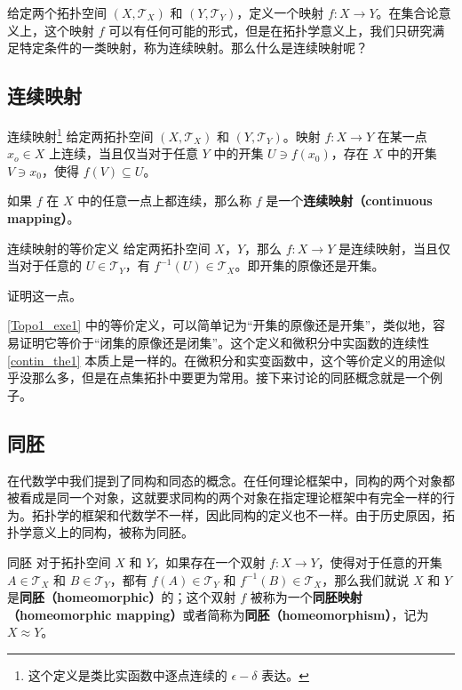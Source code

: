 

给定两个拓扑空间 $(X, \mathcal{T}_X)$ 和 $(Y, \mathcal{T}_Y)$，定义一个映射 $f:X\rightarrow Y$。在集合论意义上，这个映射 $f$ 可以有任何可能的形式，但是在拓扑学意义上，我们只研究满足特定条件的一类映射，称为连续映射。那么什么是连续映射呢？

\subsection{连续映射}
\begin{definition}{连续映射\footnote{这个定义是类比实函数中逐点连续的 $\epsilon-\delta$ 表达。}}
给定两拓扑空间 $(X, \mathcal{T}_X)$ 和 $(Y, \mathcal{T}_Y)$。映射 $f:X\rightarrow Y$ 在某一点 $x_o\in X$ 上连续，当且仅当对于任意 $Y$ 中的开集 $U\ni f(x_0)$，存在 $X$ 中的开集 $V\ni x_0$，使得 $f(V)\subseteq U$。

如果 $f$ 在 $X$ 中的任意一点上都连续，那么称 $f$ 是一个\textbf{连续映射（continuous mapping）}。
\end{definition}

\begin{exercise}{连续映射的等价定义}\label{Topo1_exe1}
给定两拓扑空间 $X$，$Y$，那么 $f:X\rightarrow Y$ 是连续映射，当且仅当对于任意的 $U\in\mathcal{T}_Y$，有 $f^{-1}(U)\in\mathcal{T}_X$。即开集的原像还是开集。

证明这一点。
\end{exercise}

\autoref{Topo1_exe1} 中的等价定义，可以简单记为“开集的原像还是开集”，类似地，容易证明它等价于“闭集的原像还是闭集”。这个定义和微积分中实函数的连续性\autoref{contin_the1} 本质上是一样的。在微积分和实变函数中，这个等价定义的用途似乎没那么多，但是在点集拓扑中要更为常用。接下来讨论的同胚概念就是一个例子。

\subsection{同胚}

在代数学中我们提到了同构和同态的概念。在任何理论框架中，同构的两个对象都被看成是同一个对象，这就要求同构的两个对象在指定理论框架中有完全一样的行为。拓扑学的框架和代数学不一样，因此同构的定义也不一样。由于历史原因，拓扑学意义上的同构，被称为同胚。

\begin{definition}{同胚}
对于拓扑空间 $X$ 和 $Y$，如果存在一个双射 $f:X\rightarrow Y$，使得对于任意的开集 $A\in\mathcal{T}_X$ 和 $B\in\mathcal{T}_Y$，都有 $f(A)\in\mathcal{T}_Y$ 和 $f^{-1}(B)\in\mathcal{T}_X$，那么我们就说 $X$ 和 $Y$ 是\textbf{同胚（homeomorphic）}的；这个双射 $f$ 被称为一个\textbf{同胚映射（homeomorphic mapping）}或者简称为\textbf{同胚（homeomorphism）}，记为 $X\approx Y$。
\end{definition}

